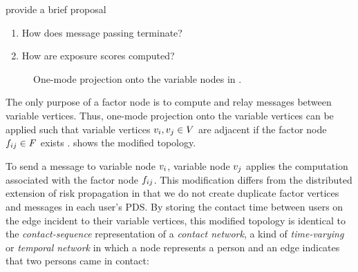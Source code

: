 \cite{Ayday2021} provide a brief proposal 

\begin{enumerate}
  \item How does message passing terminate?
  \item How are exposure scores computed?
\end{enumerate}
%
\begin{figure}[htbp]
\centering
{}
\caption[One-mode projection of a factor graph]{One-mode projection onto the variable nodes in .}
\label{fig:projected}
\end{figure}

The only purpose of a factor node is to compute and relay messages between variable vertices. Thus, one-mode projection onto the variable vertices can be applied such that variable vertices $\vVariable[i],\vVariable[j] \in \vVariables$ are adjacent if the factor node $\vFactor[ij] \in \vFactors$ exists \cite{Zhou2007}.  shows the modified topology.

To send a message to variable node $\vVariable[i]$, variable node $\vVariable[j]$ applies the computation associated with the factor node $\vFactor[ij]$. This modification differs from the distributed extension of risk propagation \cite{Ayday2021} in that we do not create duplicate factor vertices and messages in each user's PDS. By storing the contact time between users on the edge incident to their variable vertices, this modified topology is identical to the \emph{contact-sequence} representation of a \emph{contact network}, a kind of \emph{time-varying} or \emph{temporal network} in which a node represents a person and an edge indicates that two persons came in contact:

